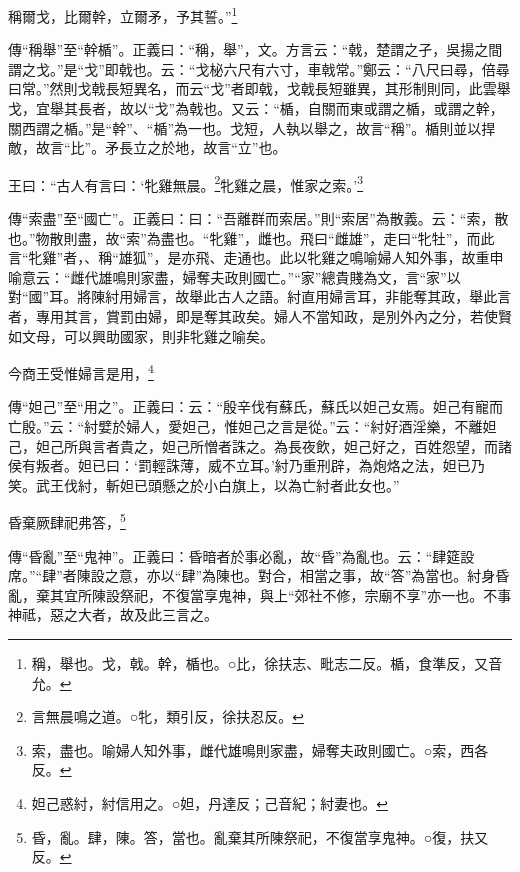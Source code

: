 稱爾戈，比爾幹，立爾矛，予其誓。”\footnote{稱，舉也。戈，戟。幹，楯也。○比，徐扶志、毗志二反。楯，食準反，又音允。}

{\noindent\zhuan{}\fzbyks 傳“稱舉”至“幹楯”。正義曰：“稱，舉”，文。方言云：“戟，楚謂之孑，吳揚之間謂之戈。”是“戈”即戟也。云：“戈柲六尺有六寸，車戟常。”鄭云：“八尺曰尋，倍尋曰常。”然則戈戟長短異名，而云“戈”者即戟，戈戟長短雖異，其形制則同，此雲舉戈，宜舉其長者，故以“戈”為戟也。又云：“楯，自關而東或謂之楯，或謂之幹，關西謂之楯。”是“幹”、“楯”為一也。戈短，人執以舉之，故言“稱”。楯則並以捍敵，故言“比”。矛長立之於地，故言“立”也。 \par}

王曰：“古人有言曰：‘牝雞無晨。\footnote{言無晨鳴之道。○牝，類引反，徐扶忍反。}牝雞之晨，惟家之索。’\footnote{索，盡也。喻婦人知外事，雌代雄鳴則家盡，婦奪夫政則國亡。○索，西各反。}

{\noindent\zhuan{}\fzbyks 傳“索盡”至“國亡”。正義曰：曰：“吾離群而索居。”則“索居”為散義。云：“索，散也。”物散則盡，故“索”為盡也。“牝雞”，雌也。飛曰“雌雄”，走曰“牝牡”，而此言“牝雞”者，、稱“雄狐”，是亦飛、走通也。此以牝雞之鳴喻婦人知外事，故重申喻意云：“雌代雄鳴則家盡，婦奪夫政則國亡。”“家”總貴賤為文，言“家”以對“國”耳。將陳紂用婦言，故舉此古人之語。紂直用婦言耳，非能奪其政，舉此言者，專用其言，賞罰由婦，即是奪其政矣。婦人不當知政，是別外內之分，若使賢如文母，可以興助國家，則非牝雞之喻矣。 \par}

今商王受惟婦言是用，\footnote{妲己惑紂，紂信用之。○妲，丹達反；己音紀；紂妻也。}

{\noindent\zhuan{}\fzbyks 傳“妲己”至“用之”。正義曰：云：“殷辛伐有蘇氏，蘇氏以妲己女焉。妲己有寵而亡殷。”云：“紂嬖於婦人，愛妲己，惟妲己之言是從。”云：“紂好酒淫樂，不離妲己，妲己所與言者貴之，妲己所憎者誅之。為長夜飲，妲己好之，百姓怨望，而諸侯有叛者。妲已曰：‘罰輕誅薄，威不立耳。’紂乃重刑辟，為炮烙之法，妲已乃笑。武王伐紂，斬妲已頭懸之於小白旗上，以為亡紂者此女也。” \par}

昏棄厥肆祀弗答，\footnote{昏，亂。肆，陳。答，當也。亂棄其所陳祭祀，不復當享鬼神。○復，扶又反。}

{\noindent\zhuan{}\fzbyks 傳“昏亂”至“鬼神”。正義曰：昏暗者於事必亂，故“昏”為亂也。云：“肆筵設席。”“肆”者陳設之意，亦以“肆”為陳也。對合，相當之事，故“答”為當也。紂身昏亂，棄其宜所陳設祭祀，不復當享鬼神，與上“郊社不修，宗廟不享”亦一也。不事神祗，惡之大者，故及此三言之。 \par}

